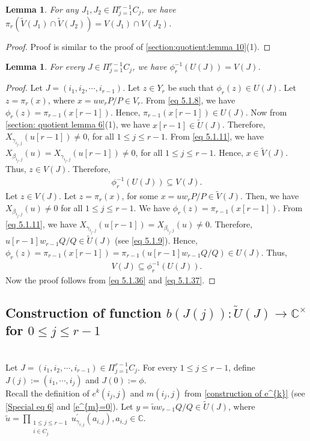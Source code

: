 \documentclass[12pt,reqno]{amsart}
\numberwithin{equation}{section}
\newtheorem{lemma}[theorem]{Lemma}
\theoremstyle{definition}
\begin{document}
\begin{lemma}\label{section:quotient:lemma 14}
	For any $J_{1},J_{2}\in\Pi_{j=1}^{r-1}C_{j}$, we have $\pi_{r}(\tilde{V}(J_{1})\cap\tilde{V}(J_{2}))=V(J_{1})\cap V(J_{2})$.
\end{lemma}
\begin{proof}
	Proof is similar to the proof of \cref{section:quotient:lemma 10}(1).
\end{proof}
	\begin{lemma}\label{section:quotient:lemma 13}
		For every $J\in\Pi_{j=1}^{r-1}C_{j}$, we have $\phi_{r}^{-1}(U(J))=V(J)$.
	\end{lemma}
	\begin{proof}Let $J=(i_{1},i_{2},\cdots,i_{r-1})$.
		Let $z\in Y_{r}$ be such that $\phi_{r}(z)\in U(J)$. Let $z=\pi_{r}(x)$, where $x=uw_{r}P/P\in V_{r}$. From \cref{eq 5.1.8}, we have $\phi_{r}(z)=\pi_{r-1}(x[r-1])$. Hence, $\pi_{r-1}(x[r-1])\in U(J)$. Now from \cref{section: quotient lemma 6}(1), we have $x[r-1]\in\tilde{U}(J)$. Therefore, $X_{\gamma_{i_{j},j}}(u[r-1])\neq 0$, for all $1\leq j\leq r-1$. From \cref{eq 5.1.11}, we have $X_{\beta_{i_{j},j}}(u)=X_{\gamma_{i_{j},j}}(u[r-1])\neq 0$, for all $1\leq j\leq r-1$. Hence, $x\in \tilde{V}(J)$. Thus, $z\in V(J)$. Therefore, \begin{align}\label{eq 5.1.36}
			\phi_{r}^{-1}(U(J))\subseteq V(J).
		\end{align}
		Let $z\in V(J)$. Let $z=\pi_{r}(x)$, for some $ x=uw_{r}P/P\in \tilde{V}(J)$. Then, we have $X_{\beta_{i_{j},j}}(u)\neq 0$ for all $1\leq j\leq r-1$. We have $\phi_{r}(z)=\pi_{r-1}(x[r-1])$. From \cref{eq 5.1.11}, we have $X_{\gamma_{i_{j},j}}(u[r-1])=X_{\beta_{i_{j},j}}(u)\neq 0$.  Therefore, $u[r-1]w_{r-1}Q/Q\in\tilde{U}(J)$ (see \cref{eq 5.1.9}). Hence,  $\phi_{r}(z)=\pi_{r-1}(x[r-1])=\pi_{r-1}(u[r-1]w_{r-1}Q/Q)\in U(J)$. Thus, \begin{align}\label{eq 5.1.37}
			V(J)\subseteq \phi_{r}^{-1}(U(J)).
		\end{align}
		Now the proof follows from \cref{eq 5.1.36} and \cref{eq 5.1.37}.
	\end{proof}
	\subsection{Construction of function $b(J(j)):\tilde{U}(J)\longrightarrow\mathbb{C^{\times}}$ for $0\leq j\leq r-1$}\ 
	\\
	Let $J=(i_{1},i_{2},\cdots,i_{r-1})\in\Pi_{j=1}^{r-1}C_{j}$. For every $1\leq j\leq r-1$, define $J(j):=(i_{1},\cdots, i_{j})$ and $J(0):=\phi.$\\ Recall the definition of $e^{k}(i_{j},j)$ and $m(i_{j},j)$ from \cref{construction of e^{k}} (see \cref{Special eq 6} and \cref{e^{m}=0}).
	Let $y=\tilde{u}w_{r-1}Q/Q\in\tilde{U}(J)$, where $\tilde{u}=\prod_{\substack{1\leq j\leq r-1\\i\in C_{j}}}u^{\prime}_{\gamma_{i,j}}(a_{i,j}), a_{i,j}\in\mathbb{C}$.
	
\end{document}
